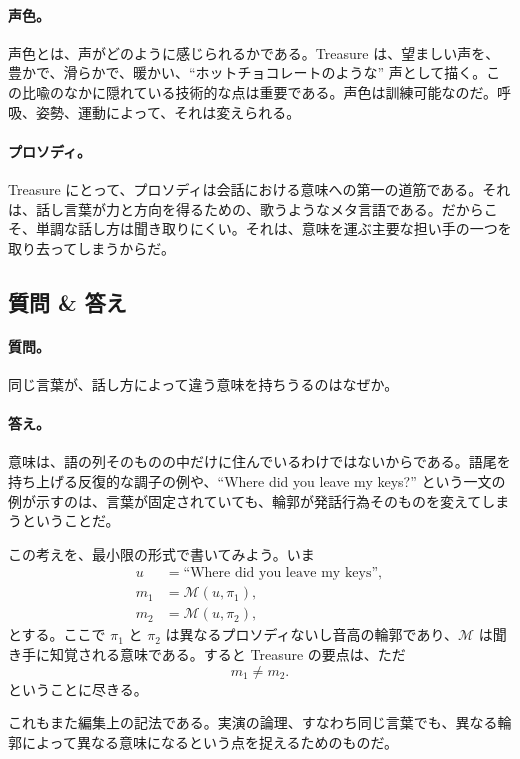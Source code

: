 \paragraph{声色。} 声色とは、声がどのように感じられるかである。Treasure は、望ましい声を、豊かで、滑らかで、暖かい、``ホットチョコレートのような'' 声として描く。この比喩のなかに隠れている技術的な点は重要である。声色は訓練可能なのだ。呼吸、姿勢、運動によって、それは変えられる。

\paragraph{プロソディ。} Treasure にとって、プロソディは会話における意味への第一の道筋である。それは、話し言葉が力と方向を得るための、歌うようなメタ言語である。だからこそ、単調な話し方は聞き取りにくい。それは、意味を運ぶ主要な担い手の一つを取り去ってしまうからだ。

\subsection{質問 \& 答え}

\paragraph{質問。} 同じ言葉が、話し方によって違う意味を持ちうるのはなぜか。

\paragraph{答え。} 意味は、語の列そのものの中だけに住んでいるわけではないからである。語尾を持ち上げる反復的な調子の例や、``Where did you leave my keys?'' という一文の例が示すのは、言葉が固定されていても、輪郭が発話行為そのものを変えてしまうということだ。

この考えを、最小限の形式で書いてみよう。いま
\begin{align}
u &= \text{``Where did you leave my keys''},\\
m_1 &= \mathcal{M}(u,\pi_1),\\
m_2 &= \mathcal{M}(u,\pi_2),
\end{align}
とする。ここで \(\pi_1\) と \(\pi_2\) は異なるプロソディないし音高の輪郭であり、\(\mathcal{M}\) は聞き手に知覚される意味である。すると Treasure の要点は、ただ
\begin{equation}
m_1 \neq m_2.
\end{equation}
ということに尽きる。

\begin{remark}
これもまた編集上の記法である。実演の論理、すなわち同じ言葉でも、異なる輪郭によって異なる意味になるという点を捉えるためのものだ。
\end{remark}

